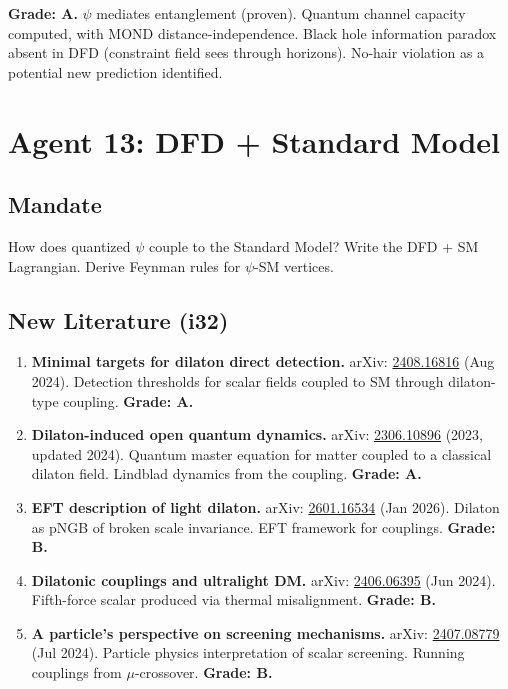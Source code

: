 \documentclass[11pt,a4paper]{article}
\begin{document}
\textbf{Grade: A.} $\psi$ mediates entanglement (proven). Quantum channel capacity computed, with MOND distance-independence. Black hole information paradox absent in DFD (constraint field sees through horizons). No-hair violation as a potential new prediction identified.


\newpage
\section{Agent 13: DFD + Standard Model}
\label{sec:agent13}

\subsection{Mandate}

How does quantized $\psi$ couple to the Standard Model? Write the DFD + SM Lagrangian. Derive Feynman rules for $\psi$-SM vertices.

\subsection{New Literature (i32)}

\begin{enumerate}
\item \textbf{Minimal targets for dilaton direct detection.} arXiv: \href{https://arxiv.org/abs/2408.16816}{2408.16816} (Aug 2024). Detection thresholds for scalar fields coupled to SM through dilaton-type coupling. \textbf{Grade: A.}

\item \textbf{Dilaton-induced open quantum dynamics.} arXiv: \href{https://arxiv.org/abs/2306.10896}{2306.10896} (2023, updated 2024). Quantum master equation for matter coupled to a classical dilaton field. Lindblad dynamics from the coupling. \textbf{Grade: A.}

\item \textbf{EFT description of light dilaton.} arXiv: \href{https://arxiv.org/abs/2601.16534}{2601.16534} (Jan 2026). Dilaton as pNGB of broken scale invariance. EFT framework for couplings. \textbf{Grade: B.}

\item \textbf{Dilatonic couplings and ultralight DM.} arXiv: \href{https://arxiv.org/abs/2406.06395}{2406.06395} (Jun 2024). Fifth-force scalar produced via thermal misalignment. \textbf{Grade: B.}

\item \textbf{A particle's perspective on screening mechanisms.} arXiv: \href{https://arxiv.org/abs/2407.08779}{2407.08779} (Jul 2024). Particle physics interpretation of scalar screening. Running couplings from $\mu$-crossover. \textbf{Grade: B.}
\end{enumerate}
\end{document}

